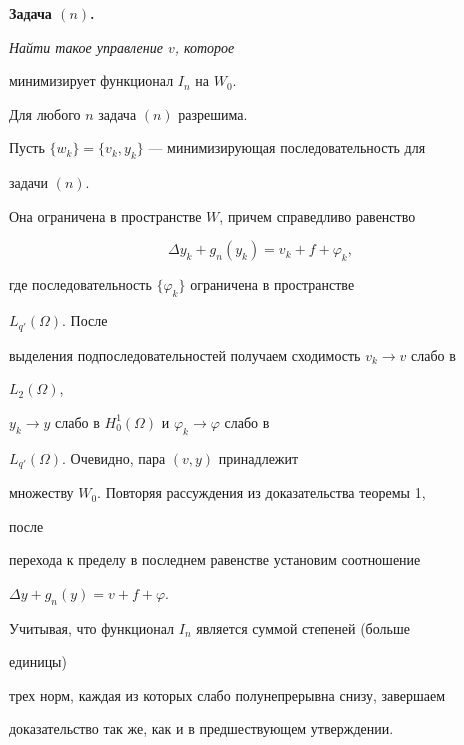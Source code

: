  


{\bf Задача $(n)$.} {\it Найти такое управление $v$, которое 


минимизирует функционал $I_n$ на $W_0$.} 


 


\begin{thm} 


Для любого $n$ задача $(n)$ разрешима. 


\end{thm} 


 


\begin{pf} 


Пусть $\{w_k\}=\{v_k,y_k\}$ --- минимизирующая последовательность для 


задачи $(n)$. 


Она ограничена в пространстве $W$, причем справедливо равенство 


$$ 


\Delta y_k+g_n(y_k)=v_k+f+\varphi_k, 


$$ 


где последовательность $\{\varphi_k\}$ ограничена в пространстве 


$L_{q'}(\Omega)$. После 


выделения подпоследовательностей получаем сходимость $v_k\to v$ слабо в 


$L_2(\Omega)$, 


$y_k\to y$ слабо в $H^1_0(\Omega)$ и $\varphi_k\to\varphi$ слабо в 


$L_{q'}(\Omega)$. Очевидно, пара $(v,y)$ принадлежит 


множеству $W_0$. Повторяя рассуждения из доказательства теоремы 1, 


после 


перехода к пределу в последнем равенстве установим соотношение 


$\Delta y+g_n(y)=v+f+\varphi$. 


Учитывая, что функционал $I_n$ является суммой степеней (больше 


единицы) 


трех норм, каждая из которых слабо полунепрерывна снизу, завершаем 


доказательство так же, как и в предшествующем утверждении. 


\end{pf} 


